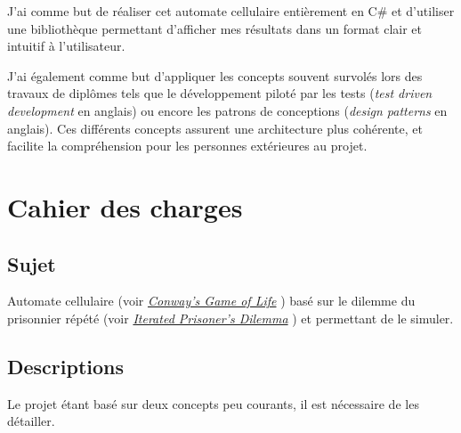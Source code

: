 \documentclass[a4paper]{article}
\begin{document}
J'ai comme but de réaliser cet automate cellulaire entièrement en C\# et d'utiliser une bibliothèque permettant d'afficher mes résultats dans un format clair et intuitif à l'utilisateur.

J'ai également comme but d'appliquer les concepts souvent survolés lors des travaux de diplômes tels que le développement piloté par les tests (\textit{test driven development} en anglais) ou encore les patrons de conceptions (\textit{design patterns} en anglais). Ces différents concepts assurent une architecture plus cohérente, et facilite la compréhension pour les personnes extérieures au projet.

\pagebreak
\section{Cahier des charges}
\subsection{Sujet}
Automate cellulaire (voir \href{https://en.wikipedia.org/wiki/Conway's\_Game\_of\_Life}{\textit{Conway's Game of Life}} \cite{GoL}) basé sur le dilemme du prisonnier répété (voir \href{https://en.wikipedia.org/wiki/Prisoner's\_dilemma#The\_iterated\_prisoner.27s\_dilemma}{\textit{Iterated Prisoner's Dilemma}} \cite{DilemmePrisonnier}) et permettant de le simuler.

\subsection{Descriptions}
Le projet étant basé sur deux concepts peu courants, il est nécessaire de les détailler.
\end{document}
